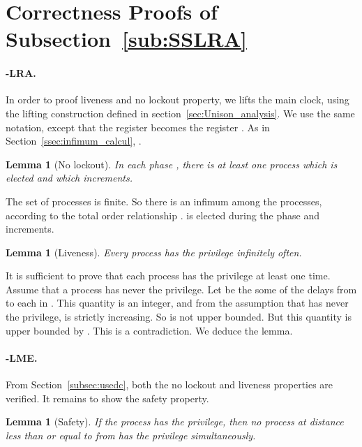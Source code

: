 \documentclass[11pt]{article}
\newenvironment{proof}{{\bf Proof. } }{{\hfill }\vspace{.5pc}}
\newtheorem{lemma}[theorem]{Lemma}
\begin{document}
\section{Correctness Proofs of Subsection~\ref{sub:SSLRA}}

\paragraph{-LRA.}

 In order to proof liveness and no lockout property,  we lifts the main clock, using the lifting construction defined in section~\ref{sec:Unison_analysis}.  
We use the same notation, except that the register  becomes the register . As in Section~\ref{ssec:infimum_calcul}, .

\begin{lemma}[No lockout]
In each phase , there is
at least one process which is elected and which increments.
\end{lemma}

\begin{proof}
The set of processes is finite. So there is an infimum  among the processes, 
according to  the total order relationship .   is elected during the phase  and   increments.
\end{proof}

\begin{lemma}[Liveness]
\label{lem:liveness}
Every process has the privilege infinitely often.
\end{lemma}

\begin{proof}
It is sufficient to prove that each process  has the privilege at least
one time. Assume that a process  has never the privilege. 
Let  be the some of the delays from  to
each  in . This quantity is an integer, and from the assumption that  has never the privilege,   is  strictly increasing.
So  is not upper bounded. But this quantity is upper bounded by
 . This is a contradiction. We deduce the lemma.
\end{proof}

\paragraph{-LME.}

From Section~\ref{subsec:usedc}, both the no lockout and liveness properties are verified. It remains to show the safety property.

\begin{lemma}[Safety]
If the process  has the privilege, then no process at distance less than
or equal to  from  has the privilege simultaneously. 
\end{lemma}
\end{document}
